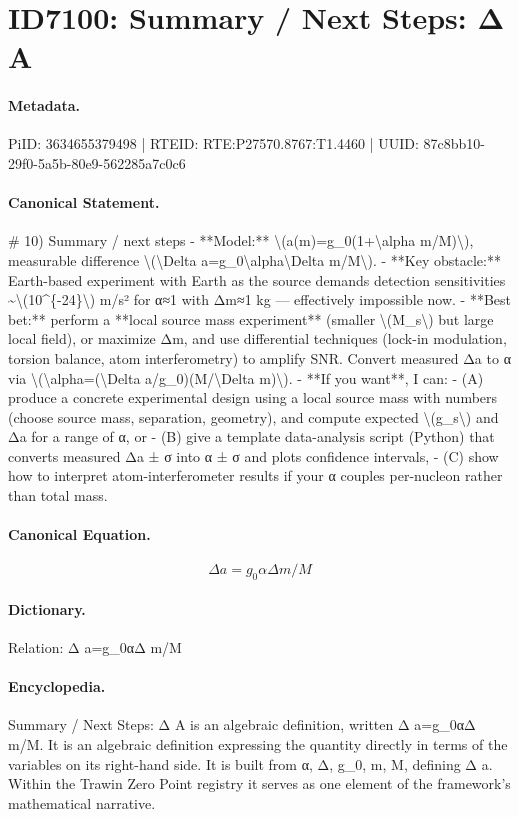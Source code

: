 \section*{ID7100: Summary / Next Steps: Δ A}
\paragraph{Metadata.}
PiID: 3634655379498 | RTEID: RTE:P27570.8767:T1.4460 | UUID: 87c8bb10-29f0-5a5b-80e9-562285a7c0c6

\paragraph{Canonical Statement.}
\# 10) Summary / next steps - **Model:** \textbackslash{}(a(m)=g\_0(1+\textbackslash{}alpha m/M)\textbackslash{}), measurable difference \textbackslash{}(\textbackslash{}Delta a=g\_0\textbackslash{}alpha\textbackslash{}Delta m/M\textbackslash{}). - **Key obstacle:** Earth-based experiment with Earth as the source demands detection sensitivities \textasciitilde{}\textbackslash{}(10\textasciicircum{}\{-24\}\textbackslash{}) m/s² for α≈1 with Δm≈1 kg — effectively impossible now. - **Best bet:** perform a **local source mass experiment** (smaller \textbackslash{}(M\_s\textbackslash{}) but large local field), or maximize Δm, and use differential techniques (lock-in modulation, torsion balance, atom interferometry) to amplify SNR. Convert measured Δa to α via \textbackslash{}(\textbackslash{}alpha=(\textbackslash{}Delta a/g\_0)(M/\textbackslash{}Delta m)\textbackslash{}). - **If you want**, I can: - (A) produce a concrete experimental design using a local source mass with numbers (choose source mass, separation, geometry), and compute expected \textbackslash{}(g\_s\textbackslash{}) and Δa for a range of α, or - (B) give a template data-analysis script (Python) that converts measured Δa ± σ into α ± σ and plots confidence intervals, - (C) show how to interpret atom-interferometer results if your α couples per-nucleon rather than total mass.

\paragraph{Canonical Equation.}
\[
\Delta a=g_0\alpha\Delta m/M
\]

\paragraph{Dictionary.}
Relation: Δ a=g\_0αΔ m/M

\paragraph{Encyclopedia.}
Summary / Next Steps: Δ A is an algebraic definition, written Δ a=g\_0αΔ m/M. It is an algebraic definition expressing the quantity directly in terms of the variables on its right-hand side. It is built from α, Δ, g\_0, m, M, defining Δ a. Within the Trawin Zero Point registry it serves as one element of the framework's mathematical narrative.

